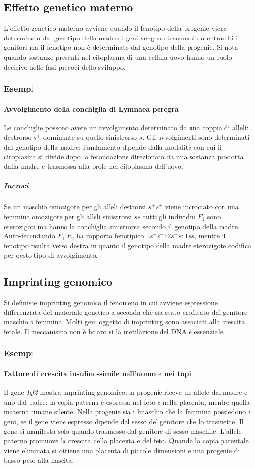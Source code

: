 \subsection{Effetto genetico materno}
L'effetto genetico materno avviene quando il fenotipo della progenie viene determinato dal genotipo della madre: i geni vengono trasmessi da entrambi i genitori ma il fenotipo non \`e determinato dal
genotipo della progenie. Si nota quando sostanze presenti nel citoplasma di una cellula uovo hanno un ruolo decisivo nelle fasi precoci dello sviluppo.
\subsubsection{Esempi}
\paragraph{Avvolgimento della conchiglia di Lymnaea peregra}
Le conchiglie possono avere un avvolgimento determinato da una coppia di alleli: destrorso $s^+$ dominante su quello sinistrorso $s$. Gli avvolgimenti sono determinati dal genotipo della madre: l'andamento
dipende dalla modalit\`a con cui il citoplasma si divide dopo la fecondazione direzionato da una sostanza prodotta dalla madre e trasmessa alla prole nel citoplasma dell'uovo.
\subparagraph{Incroci}
Se un maschio omozigote per gli alleli destrorsi $s^+s^+$ viene incrociato con una femmina omozigote per gli alleli sinistrorsi $ss$ tutti gli individui $F_1$ sono eterozigoti ma hanno la conchiglia
sinistrorsa secondo il genotipo della madre. Auto-fecondando $F_1$ $F_2$ ha rapporto fenotipico $1 s^+s^+:2s^+s:1ss$, mentre il fenotipo risulta verso destra in quanto il genotipo della madre eterozigote
codifica per qesto tipo di avvolgimento. 
\subsection{Imprinting genomico}
Si definisce imprinting genomico il fenomeno in cui avviene espressione differenziata del materiale genetico a seconda che sia stato ereditato dal genitore maschio o femmina. Molti geni oggetto di 
imprinting sono associati alla crescita fetale. Il meccanismo non \`e hciaro si la metilazione del DNA \`e essenziale. 
\subsubsection{Esempi}
\paragraph{Fattore di crescita insulino-simile nell'uomo e nei topi}
Il gene \emph{Igf2} mostra imprinting genomico: la progenie riceve un allele dal madre e uno dal padre: la copia paterna \`e espressa nel feto e nella placenta, mentre quella materna rimane silente.
Nella progenie sia i lmaschio che la femmina possiedono i geni, se il gene viene espresso dipende dal sesso del genitore che lo trasmette. Il gene si manifesta solo quando trasmesso dal
genitore di sesso maschile. L'allele paterno promuove la crescita della placenta e del feto. Quando la copia parentale viene eliminata si ottiene una placenta di piccole dimensioni e una progenie di 
basso peso alla nascita. 
